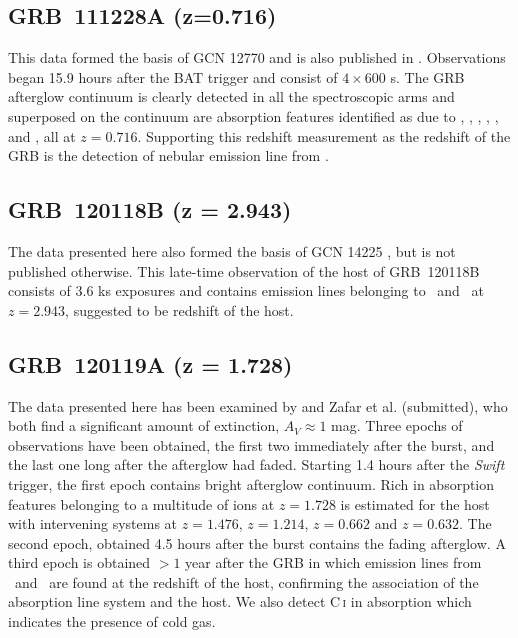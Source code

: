 \documentclass{aa}    %
\begin{document}
\subsection{GRB~111228A (z=0.716)} \label{111228}

This data formed the basis of GCN 12770 \citep{GCN12770} and is also published
in \cite{Kruhler2015}. Observations began 15.9 hours after the BAT trigger and
consist of $4 \times 600$ s. The GRB afterglow continuum is clearly detected in
all the spectroscopic arms and superposed on the continuum are absorption
features identified as due to \feii, \mnii, \mgii, \mgi, \cah, and \cak, all at
$z = 0.716$. Supporting this redshift measurement as the redshift of the GRB is
the detection of nebular emission line from \oiii.

\subsection{GRB~120118B (z = 2.943)} \label{120118}

The data presented here also formed the basis of GCN 14225 \citep{GCN14225}, but
is not published otherwise. This late-time observation of the host of
GRB~120118B consists of 3.6 ks exposures and contains emission lines belonging
to \oii~and \oiii~at $z = 2.943$, suggested to be redshift of the host.

\subsection{GRB~120119A (z = 1.728)} \label{120119}

The data presented here has been examined by \citet{Japelj2015} and
Zafar et al. (submitted), who both find a significant amount of extinction, $A_V\approx
1$ mag. Three epochs of observations have been obtained, the first two
immediately after the burst, and the last one long after the afterglow had
faded. Starting 1.4 hours after the \textit{Swift} trigger, the first epoch
contains bright afterglow continuum. Rich in absorption features belonging to a
multitude of ions at $z =    1.728$ is estimated for the host with intervening
systems at $z = 1.476$, $z = 1.214$, $z = 0.662$ and $z = 0.632$. The second
epoch, obtained 4.5 hours after the burst contains the fading afterglow. A third
epoch is obtained $>1$ year after the GRB in which emission lines from \hb~and
\ha~are found at the redshift of the host, confirming the association of the
absorption line system and the host. We also detect C\,\textsc{i} in absorption
which indicates the presence of cold gas.
\end{document}
